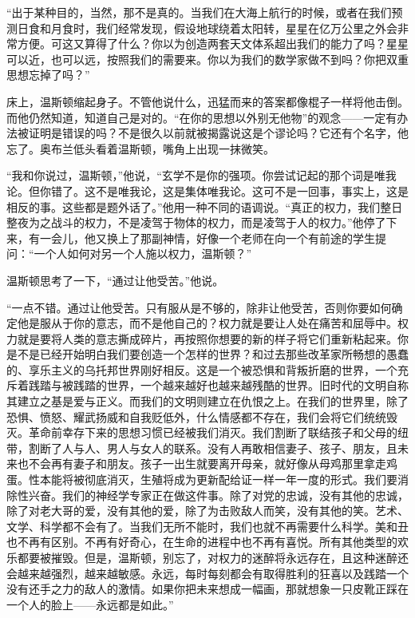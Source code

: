 ``出于某种目的，当然，那不是真的。当我们在大海上航行的时候，或者在我们预测日食和月食时，我们经常发现，假设地球绕着太阳转，星星在亿万公里之外会非常方便。可这又算得了什么？你以为创造两套天文体系超出我们的能力了吗？星星可以近，也可以远，按照我们的需要来。你以为我们的数学家做不到吗？你把双重思想忘掉了吗？''

床上，温斯顿缩起身子。不管他说什么，迅猛而来的答案都像棍子一样将他击倒。而他仍然知道，知道自己是对的。``在你的思想以外别无他物''的观念------一定有办法被证明是错误的吗？不是很久以前就被揭露说这是个谬论吗？它还有个名字，他忘了。奥布兰低头看着温斯顿，嘴角上出现一抹微笑。

``我和你说过，温斯顿，''他说，``玄学不是你的强项。你尝试记起的那个词是唯我论。但你错了。这不是唯我论，这是集体唯我论。这可不是一回事，事实上，这是相反的事。这些都是题外话了。''他用一种不同的语调说。``真正的权力，我们整日整夜为之战斗的权力，不是凌驾于物体的权力，而是凌驾于人的权力。''他停了下来，有一会儿，他又换上了那副神情，好像一个老师在向一个有前途的学生提问：``一个人如何对另一个人施以权力，温斯顿？''

温斯顿思考了一下，``通过让他受苦。''他说。

``一点不错。通过让他受苦。只有服从是不够的，除非让他受苦，否则你要如何确定他是服从于你的意志，而不是他自己的？权力就是要让人处在痛苦和屈辱中。权力就是要将人类的意志撕成碎片，再按照你想要的新的样子将它们重新粘起来。你是不是已经开始明白我们要创造一个怎样的世界？和过去那些改革家所畅想的愚蠢的、享乐主义的乌托邦世界刚好相反。这是一个被恐惧和背叛折磨的世界，一个充斥着践踏与被践踏的世界，一个越来越好也越来越残酷的世界。旧时代的文明自称其建立之基是爱与正义。而我们的文明则建立在仇恨之上。在我们的世界里，除了恐惧、愤怒、耀武扬威和自我贬低外，什么情感都不存在，我们会将它们统统毁灭。革命前幸存下来的思想习惯已经被我们消灭。我们割断了联结孩子和父母的纽带，割断了人与人、男人与女人的联系。没有人再敢相信妻子、孩子、朋友，且未来也不会再有妻子和朋友。孩子一出生就要离开母亲，就好像从母鸡那里拿走鸡蛋。性本能将被彻底消灭，生殖将成为更新配给证一样一年一度的形式。我们要消除性兴奋。我们的神经学专家正在做这件事。除了对党的忠诚，没有其他的忠诚，除了对老大哥的爱，没有其他的爱，除了为击败敌人而笑，没有其他的笑。艺术、文学、科学都不会有了。当我们无所不能时，我们也就不再需要什么科学。美和丑也不再有区别。不再有好奇心，在生命的进程中也不再有喜悦。所有其他类型的欢乐都要被摧毁。但是，温斯顿，别忘了，对权力的迷醉将永远存在，且这种迷醉还会越来越强烈，越来越敏感。永远，每时每刻都会有取得胜利的狂喜以及践踏一个没有还手之力的敌人的激情。如果你把未来想成一幅画，那就想象一只皮靴正踩在一个人的脸上------永远都是如此。''


